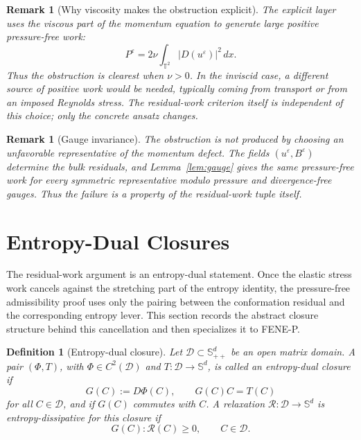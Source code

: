 \documentclass[11pt]{article}
\numberwithin{equation}{section}
\newtheorem{definition}[theorem]{Definition}
\newtheorem{remark}[theorem]{Remark}
\newcommand{\T}{\mathbb T}
\newcommand{\Spp}{\mathbb S_{++}}
\newcommand{\Sym}{\mathbb S}
\newcommand{\calD}{\mathcal D}
\newcommand{\eps}{\varepsilon}
\begin{document}
\begin{remark}[Why viscosity makes the obstruction explicit]
The explicit layer uses the viscous part of the momentum equation to generate
large positive pressure-free work:
\[
  P^\eps=2\nu\int_{\T^2}|D(u^\eps)|^2\,dx .
\]
Thus the obstruction is clearest when \(\nu>0\).  In the inviscid case, a
different source of positive work would be needed, typically coming from
transport or from an imposed Reynolds stress.  The residual-work criterion
itself is independent of this choice; only the concrete ansatz changes.
\end{remark}


\begin{remark}[Gauge invariance]
The obstruction is not produced by choosing an unfavorable representative of
the momentum defect.  The fields \((u^\varepsilon,B^\varepsilon)\) determine
the bulk residuals, and Lemma~\ref{lem:gauge} gives the same pressure-free work
for every symmetric representative modulo pressure and divergence-free gauges.
Thus the failure is a property of the residual-work tuple itself.
\end{remark}

\section{Entropy-Dual Closures}
\label{sec:fenep-residual}

The residual-work argument is an entropy-dual statement.  Once the elastic
stress work cancels against the stretching part of the entropy identity, the
pressure-free admissibility proof uses only the pairing between the
conformation residual and the corresponding entropy lever.  This section
records the abstract closure structure behind this cancellation and then
specializes it to FENE-P.

\begin{definition}[Entropy-dual closure]
\label{def:entropy-dual-closure}
Let \(\calD\subset\Spp^d\) be an open matrix domain.  A pair
\((\Phi,T)\), with \(\Phi\in C^2(\calD)\) and
\(T:\calD\to\Sym^d\), is called an entropy-dual closure if
\[
  G(C):=D\Phi(C),\qquad G(C)C=T(C)
  \label{eq:entropy-dual-compatibility}
\]
for all \(C\in\calD\), and if \(G(C)\) commutes with \(C\).  A relaxation
\(\mathcal R:\calD\to\Sym^d\) is
entropy-dissipative for this closure if
\[
  G(C):\mathcal R(C)\ge0,\qquad C\in\calD .
\]
\end{definition}
\end{document}
